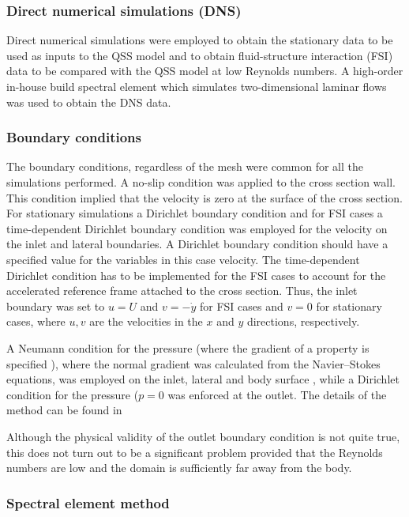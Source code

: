 \subsubsection{Direct numerical simulations (DNS)}

Direct numerical simulations were employed to obtain the stationary data to be used as inputs to the QSS model and to obtain  fluid-structure interaction (FSI) data to be compared with the QSS model at low Reynolds numbers. A high-order in-house build spectral element which simulates two-dimensional laminar flows was used to obtain the DNS data.   


\subsubsection{Boundary conditions}

The boundary conditions, regardless of the mesh  were common for all the simulations performed. A no-slip condition was applied to the cross section wall. This condition implied that the velocity is zero at the surface of the cross section. For stationary simulations a Dirichlet boundary condition and for FSI cases a time-dependent Dirichlet boundary condition was employed for the velocity on the inlet and lateral boundaries. A Dirichlet boundary condition should have a specified value for the variables \citep{kreyszig2010} in this case velocity. The time-dependent Dirichlet condition has to be implemented for the FSI cases to account for the accelerated reference frame attached to the cross section. Thus, the inlet boundary was set to $u=U$ and $v=-\dot{y}$ for FSI cases and $v=0$ for stationary cases, where $u,v$ are the velocities in the $x$ and $y$ directions, respectively.

A Neumann condition for the pressure (where the gradient of a property is specified \citet{tu2007}), where the normal gradient was calculated from the Navier--Stokes equations, was employed on the inlet, lateral and body surface \citep{gresho1987}, while a Dirichlet condition for the pressure ($p=0$ was enforced at the outlet. The details of the method can be found in \citet{Thompson2006,Thompson1996a}

 Although the physical validity of the outlet boundary condition is not quite true, this does not turn out to be a significant problem provided that the Reynolds numbers are low and the domain is sufficiently far away from the body.


\subsubsection{Spectral element method}
 
